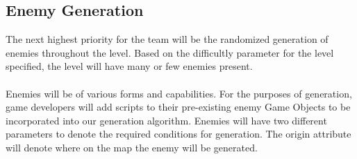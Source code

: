 \documentclass[pdftex,12pt,letter]{article}
\begin{document}
\subsection{Enemy Generation}
\label{Enemy Generation}
The next highest priority for the team will be the randomized generation of enemies throughout the level. Based on the difficultly parameter for the level specified, the level will have many or few enemies present. 
\\\\
Enemies will be of various forms and capabilities. For the purposes of generation, game developers will add scripts to their pre-existing enemy Game Objects to be incorporated into our generation algorithm. Enemies will have two different parameters to denote the required conditions for generation. The origin attribute will denote where on the map the enemy will be generated. 
\end{document}
